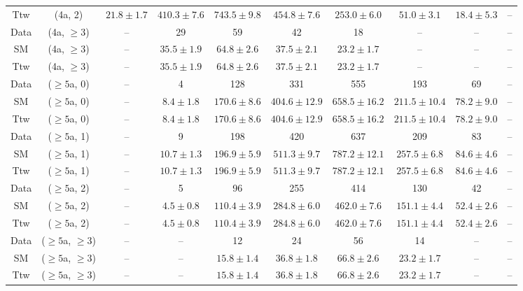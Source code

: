 \begin{table}[h!]
{\begin{tabular}{cccccccccc}
	Ttw & (4a, 2) & $21.8\pm 1.7$ & $410.3\pm 7.6$ & $743.5\pm 9.8$ & $454.8\pm 7.6$ & $253.0\pm 6.0$ & $51.0\pm 3.1$ & $18.4\pm 5.3$ & -- \\[0.5ex] 
	Data & (4a, $\ge3$) & -- & 29 & 59 & 42 & 18 & -- & -- & -- \\[0.5ex] 
	SM & (4a, $\ge3$) & -- & $35.5\pm 1.9$ & $64.8\pm 2.6$ & $37.5\pm 2.1$ & $23.2\pm 1.7$ & -- & -- & -- \\[0.5ex] 
	Ttw & (4a, $\ge3$) & -- & $35.5\pm 1.9$ & $64.8\pm 2.6$ & $37.5\pm 2.1$ & $23.2\pm 1.7$ & -- & -- & -- \\[0.5ex] 
	Data & ($\ge5$a, 0) & -- & 4 & 128 & 331 & 555 & 193 & 69 & -- \\[0.5ex] 
	SM & ($\ge5$a, 0) & -- & $8.4\pm 1.8$ & $170.6\pm 8.6$ & $404.6\pm 12.9$ & $658.5\pm 16.2$ & $211.5\pm 10.4$ & $78.2\pm 9.0$ & -- \\[0.5ex] 
	Ttw & ($\ge5$a, 0) & -- & $8.4\pm 1.8$ & $170.6\pm 8.6$ & $404.6\pm 12.9$ & $658.5\pm 16.2$ & $211.5\pm 10.4$ & $78.2\pm 9.0$ & -- \\[0.5ex] 
	Data & ($\ge5$a, 1) & -- & 9 & 198 & 420 & 637 & 209 & 83 & -- \\[0.5ex] 
	SM & ($\ge5$a, 1) & -- & $10.7\pm 1.3$ & $196.9\pm 5.9$ & $511.3\pm 9.7$ & $787.2\pm 12.1$ & $257.5\pm 6.8$ & $84.6\pm 4.6$ & -- \\[0.5ex] 
	Ttw & ($\ge5$a, 1) & -- & $10.7\pm 1.3$ & $196.9\pm 5.9$ & $511.3\pm 9.7$ & $787.2\pm 12.1$ & $257.5\pm 6.8$ & $84.6\pm 4.6$ & -- \\[0.5ex] 
	Data & ($\ge5$a, 2) & -- & 5 & 96 & 255 & 414 & 130 & 42 & -- \\[0.5ex] 
	SM & ($\ge5$a, 2) & -- & $4.5\pm 0.8$ & $110.4\pm 3.9$ & $284.8\pm 6.0$ & $462.0\pm 7.6$ & $151.1\pm 4.4$ & $52.4\pm 2.6$ & -- \\[0.5ex] 
	Ttw & ($\ge5$a, 2) & -- & $4.5\pm 0.8$ & $110.4\pm 3.9$ & $284.8\pm 6.0$ & $462.0\pm 7.6$ & $151.1\pm 4.4$ & $52.4\pm 2.6$ & -- \\[0.5ex] 
	Data & ($\ge5$a, $\ge3$) & -- & -- & 12 & 24 & 56 & 14 & -- & -- \\[0.5ex] 
	SM & ($\ge5$a, $\ge3$) & -- & -- & $15.8\pm 1.4$ & $36.8\pm 1.8$ & $66.8\pm 2.6$ & $23.2\pm 1.7$ & -- & -- \\[0.5ex] 
	Ttw & ($\ge5$a, $\ge3$) & -- & -- & $15.8\pm 1.4$ & $36.8\pm 1.8$ & $66.8\pm 2.6$ & $23.2\pm 1.7$ & -- & -- \\[0.5ex] 
	\hline
	\hline
\end{tabular}}
\end{table}
